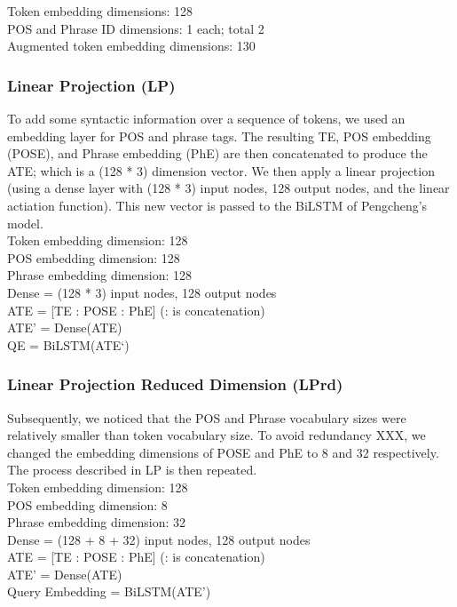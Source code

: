 \documentclass{IEEEtran}
\begin{document}
        \hspace*{-4mm}Token embedding dimensions: 128 \\
        POS and Phrase ID dimensions: 1 each; total 2 \\
        Augmented token embedding dimensions: 130 \\

        \subsubsection{Linear Projection (LP)}
        To add some syntactic information over a sequence of tokens, we used an embedding layer for
        POS and phrase tags. The resulting TE, POS embedding (POSE), and Phrase embedding (PhE) are
        then concatenated to produce the ATE; which is a (128 * 3) dimension vector. We then
        apply a linear projection (using a dense layer with (128 * 3) input nodes, 128 output 
        nodes, and the linear actiation function). This new vector is passed to the BiLSTM of 
        Pengcheng's model. \\

        \hspace*{-4mm}Token embedding dimension: 128 \\
        POS embedding dimension: 128 \\
        Phrase embedding dimension: 128 \\
        Dense = (128 * 3) input nodes, 128 output nodes \\ 
        ATE = [TE : POSE : PhE] (: is concatenation)\\
        ATE' = Dense(ATE) \\
        QE = BiLSTM(ATE`) \\

        \subsubsection{Linear Projection Reduced Dimension (LPrd)} 
        Subsequently, we noticed that the POS and Phrase vocabulary sizes were relatively smaller
        than token vocabulary size. To avoid redundancy XXX, we changed the embedding dimensions
        of POSE and PhE to 8 and 32 respectively. The process described in LP is then repeated. \\

        \hspace*{-4mm}Token embedding dimension: 128 \\
        POS embedding dimension: 8 \\
        Phrase embedding dimension: 32 \\
        Dense = (128 + 8 + 32) input nodes, 128 output nodes \\
        ATE = [TE : POSE : PhE] (: is concatenation)\\
        ATE' = Dense(ATE) \\
        Query Embedding = BiLSTM(ATE') \\
\end{document}
